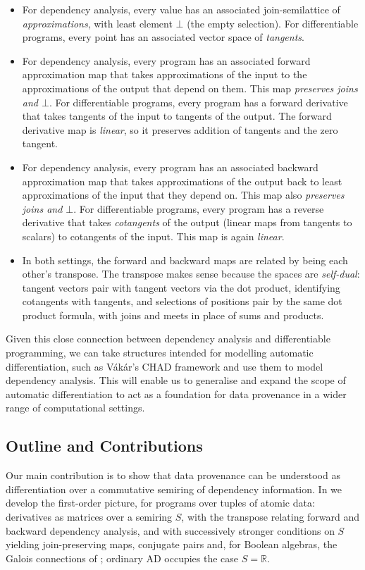 \begin{itemize}[leftmargin=\enummargin]
\item For dependency analysis, every value has an associated join-semilattice of \emph{approximations}, with
least element $\bot$ (the empty selection). For differentiable programs, every point has an associated vector
space of {\em tangents}.
\item For dependency analysis, every program has an associated forward approximation map that takes
approximations of the input to the approximations of the output that depend on them. This map {\em preserves
joins and $\bot$}. For differentiable programs, every program has a forward derivative that takes tangents of
the input to tangents of the output. The forward derivative map is {\em linear}, so it preserves addition of
tangents and the zero tangent.
\item For dependency analysis, every program has an associated backward approximation map that takes
approximations of the output back to least approximations of the input that they depend on. This map also {\em
preserves joins and $\bot$}. For differentiable programs, every program has a reverse derivative that takes
\emph{cotangents} of the output (linear maps from tangents to scalars) to cotangents of the input. This map is
again {\em linear}.
\item In both settings, the forward and backward maps are related by being each other's transpose. The
transpose makes sense because the spaces are \emph{self-dual}: tangent vectors pair with tangent vectors via
the dot product, identifying cotangents with tangents, and selections of positions pair by the same dot
product formula, with joins and meets in place of sums and products.
\end{itemize}

Given this close connection between dependency analysis and differentiable programming, we can take structures
intended for modelling automatic differentiation, such as V{\'a}k{\'a}r's CHAD framework and use them to model
dependency analysis. This will enable us to generalise and expand the scope of automatic differentiation to
act as a foundation for data provenance in a wider range of computational settings.

\subsection{Outline and Contributions}

Our main contribution is to show that data provenance can be understood as differentiation over a commutative
semiring of dependency information. In  we develop the first-order picture, for
programs over tuples of atomic data: derivatives as matrices over a semiring $S$, with the transpose relating
forward and backward dependency analysis, and with successively stronger conditions on $S$ yielding
join-preserving maps, conjugate pairs and, for Boolean algebras, the Galois connections of \GPS; ordinary AD
occupies the case $S = \mathbb{R}$.

